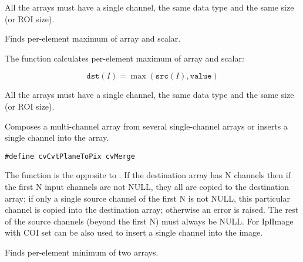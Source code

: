 All the arrays must have a single channel, the same data type and the same size (or ROI size).


Finds per-element maximum of array and scalar.


\begin{description}
\end{description}

The function calculates per-element maximum of array and scalar:

\[
\texttt{dst}(I)=\max(\texttt{src}(I), \texttt{value})
\]

All the arrays must have a single channel, the same data type and the same size (or ROI size).


Composes a multi-channel array from several single-channel arrays or inserts a single channel into the array.

\ifC
\begin{lstlisting}
#define cvCvtPlaneToPix cvMerge
\end{lstlisting}
\fi
{}

\begin{description}
\end{description}

The function is the opposite to . If the destination array has N channels then if the first N input channels are not NULL, they all are copied to the destination array; if only a single source channel of the first N is not NULL, this particular channel is copied into the destination array; otherwise an error is raised. The rest of the source channels (beyond the first N) must always be NULL. For IplImage  with COI set can be also used to insert a single channel into the image.

Finds per-element minimum of two arrays.


